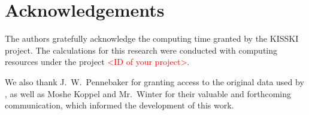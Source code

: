 \section*{Acknowledgements}

The authors gratefully acknowledge the computing time granted by the KISSKI project. 
The calculations for this research were conducted with computing resources under the project \textcolor{red}{<ID of your project>}.

We also thank J.~W.~Pennebaker for granting access to the original data used by \citet{koppel_determining_2014}, as well as Moshe Koppel and Mr.~Winter for their valuable and forthcoming communication, which informed the development of this work.